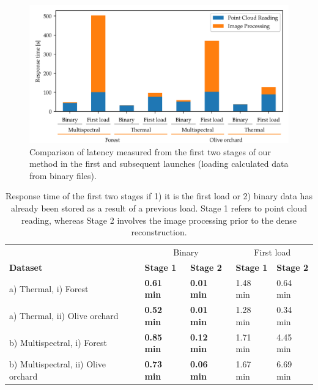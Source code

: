\begin{figure}[ht]
    \centering
    \includegraphics[width=\linewidth]{figs/multi_thermal_projection/results/binary_response_time.png}
    \caption{Comparison of latency measured from the first two stages of our method in the first and subsequent launches (loading calculated data from binary files).}
	\label{fig:occlusion_binary_response_time}
\end{figure}

\renewcommand{\arraystretch}{1.2}
\begin{table}
    \sffamily
    \centering
    \caption{Response time of the first two stages if 1) it is the first load or 2) binary data has already been stored as a result of a previous load. Stage 1 refers to point cloud reading, whereas Stage 2 involves the image processing prior to the dense reconstruction. }
    \label{table:binary_results}
    \begin{tabular}{l|llll}
    \toprule
    & \multicolumn{2}{c}{Binary} & \multicolumn{2}{c}{First load}\\
    \cmidrule{1-5}
    \textbf{Dataset} & \textbf{Stage 1} & \textbf{Stage 2} & \textbf{Stage 1} & \textbf{Stage 2}\\
    \cmidrule{1-5}
    a) Thermal, i) Forest & \textbf{0.61 \si{\minute}} & \textbf{0.01 \si{\minute}} & 1.48 \si{\minute} & 0.64 \si{\minute}\\
    \cmidrule{1-5}
    a) Thermal, ii) Olive orchard & \textbf{0.52 \si{\minute}} & \textbf{0.01 \si{\minute}} & 1.28 \si{\minute} & 0.34 \si{\minute}\\
    \cmidrule{1-5}
    b) Multispectral, i) Forest & \textbf{0.85 \si{\minute}} & \textbf{0.12 \si{\minute}} & 1.71 \si{\minute} & 4.45 \si{\minute}\\
    \cmidrule{1-5}
    b) Multispectral, ii) Olive orchard & \textbf{0.73 \si{\minute}} & \textbf{0.06 \si{\minute}} & 1.67 \si{\minute} & 6.69 \si{\minute}\\
    \bottomrule
    \end{tabular}
\end{table}
\renewcommand{\arraystretch}{1}

